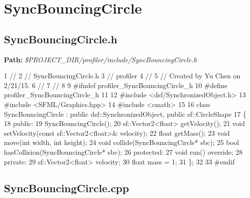  \hypertarget{_benchmark_program_BenchmarkProgramSyncBouncingCircle}{}\section{Sync\+Bouncing\+Circle}\label{_benchmark_program_BenchmarkProgramSyncBouncingCircle}
\hypertarget{_benchmark_program_BenchmarkProgramSyncBouncingCircle_h}{}\subsection{Sync\+Bouncing\+Circle.\+h}\label{_benchmark_program_BenchmarkProgramSyncBouncingCircle_h}
{\bfseries Path\+:} {\itshape \$\+P\+R\+O\+J\+E\+C\+T\+\_\+\+D\+I\+R/profiler/include/\+Sync\+Bouncing\+Circle.h} 
\begin{DoxyCodeInclude}
1 \textcolor{comment}{//}
2 \textcolor{comment}{//  SyncBouncingCircle.h}
3 \textcolor{comment}{//  profiler}
4 \textcolor{comment}{//}
5 \textcolor{comment}{//  Created by Yu Chen on 2/21/15.}
6 \textcolor{comment}{//}
7 \textcolor{comment}{//}
8 
9 \textcolor{preprocessor}{#ifndef profiler\_SyncBouncingCircle\_h}
10 \textcolor{preprocessor}{#define profiler\_SyncBouncingCircle\_h}
11 
12 \textcolor{preprocessor}{#include <dsf/SynchronizedObject.h>}
13 \textcolor{preprocessor}{#include <SFML/Graphics.hpp>}
14 \textcolor{preprocessor}{#include <cmath>}
15 
16 \textcolor{keyword}{class }SyncBouncingCircle : \textcolor{keyword}{public} dsf::SynchronizedObject, \textcolor{keyword}{public} sf::CircleShape
17 \{
18 \textcolor{keyword}{public}:
19     SyncBouncingCircle();
20     sf::Vector2<float> getVelocity();
21     \textcolor{keywordtype}{void} setVelocity(\textcolor{keyword}{const} sf::Vector2<float>& velocity);
22     \textcolor{keywordtype}{float} getMass();
23     \textcolor{keywordtype}{void} move(\textcolor{keywordtype}{int} width, \textcolor{keywordtype}{int} height);
24     \textcolor{keywordtype}{void} collide(SyncBouncingCircle* sbc);
25     \textcolor{keywordtype}{bool} hasCollision(SyncBouncingCircle* sbc);
26 \textcolor{keyword}{protected}:
27     \textcolor{keywordtype}{void} run() \textcolor{keyword}{override};
28 \textcolor{keyword}{private}:
29     sf::Vector2<float> velocity;
30     \textcolor{keywordtype}{float} mass = 1;
31 \};
32 
33 \textcolor{preprocessor}{#endif}
\end{DoxyCodeInclude}
 \hypertarget{_benchmark_program_BenchmarkProgramSyncBouncingCircle_cpp}{}\subsection{Sync\+Bouncing\+Circle.\+cpp}\label{_benchmark_program_BenchmarkProgramSyncBouncingCircle_cpp}
